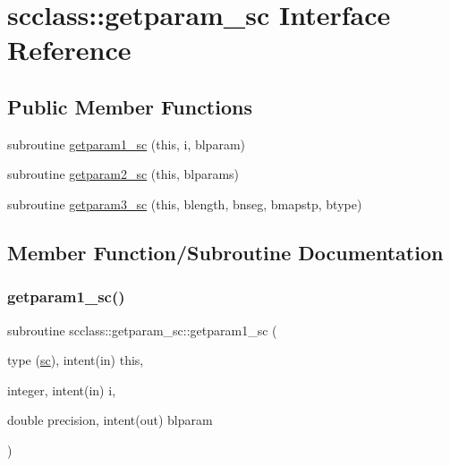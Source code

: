 \hypertarget{interfacescclass_1_1getparam__sc}{}\section{scclass\+::getparam\+\_\+sc Interface Reference}
\label{interfacescclass_1_1getparam__sc}
\subsection*{Public Member Functions}
\begin{DoxyCompactItemize}
\item 
subroutine \mbox{\hyperlink{interfacescclass_1_1getparam__sc_a3f5c5e7c72dfde7bb16a13ec8d000cf8}{getparam1\+\_\+sc}} (this, i, blparam)
\item 
subroutine \mbox{\hyperlink{interfacescclass_1_1getparam__sc_a55d64ae68903d972cfc2902370c300ff}{getparam2\+\_\+sc}} (this, blparams)
\item 
subroutine \mbox{\hyperlink{interfacescclass_1_1getparam__sc_afd39ed5e41024d90d1ccf3332951a9f1}{getparam3\+\_\+sc}} (this, blength, bnseg, bmapstp, btype)
\end{DoxyCompactItemize}


\subsection{Member Function/\+Subroutine Documentation}
\mbox{\label{interfacescclass_1_1getparam__sc_a3f5c5e7c72dfde7bb16a13ec8d000cf8}} 
\subsubsection{\texorpdfstring{getparam1\_sc()}{getparam1\_sc()}}
{\footnotesize\ttfamily subroutine scclass\+::getparam\+\_\+sc\+::getparam1\+\_\+sc (\begin{DoxyParamCaption}\item[{type (\mbox{\hyperlink{namespacescclass_structscclass_1_1sc}{sc}}), intent(in)}]{this,  }\item[{integer, intent(in)}]{i,  }\item[{double precision, intent(out)}]{blparam }\end{DoxyParamCaption})}

